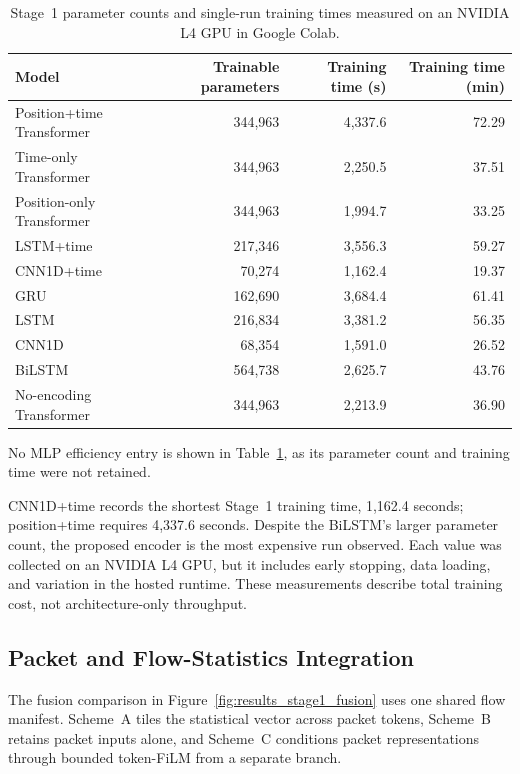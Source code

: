 \documentclass[11pt,fleqn]{report}
\begin{document}
\begin{table}[H]
    \centering
    \caption{Stage~1 parameter counts and single-run training times measured on an NVIDIA L4 GPU in Google Colab.}
    \label{tab:results_stage1_errors_efficiency}
    \begin{tabular}{@{}lrrr@{}}
        \toprule
        Model & Trainable parameters & Training time (s) & Training time (min) \\
        \midrule
        Position+time Transformer & 344,963 & 4,337.6 & 72.29 \\
        Time-only Transformer & 344,963 & 2,250.5 & 37.51 \\
        Position-only Transformer & 344,963 & 1,994.7 & 33.25 \\
        LSTM+time & 217,346 & 3,556.3 & 59.27 \\
        CNN1D+time & 70,274 & 1,162.4 & 19.37 \\
        GRU & 162,690 & 3,684.4 & 61.41 \\
        LSTM & 216,834 & 3,381.2 & 56.35 \\
        CNN1D & 68,354 & 1,591.0 & 26.52 \\
        BiLSTM & 564,738 & 2,625.7 & 43.76 \\
        No-encoding Transformer & 344,963 & 2,213.9 & 36.90 \\
        \bottomrule
    \end{tabular}
\end{table}

No MLP efficiency entry is shown in Table~\ref{tab:results_stage1_errors_efficiency}, as its parameter count and training time were not retained.

CNN1D+time records the shortest Stage~1 training time, 1,162.4 seconds; position+time requires 4,337.6 seconds. Despite the BiLSTM's larger parameter count, the proposed encoder is the most expensive run observed. Each value was collected on an NVIDIA L4 GPU, but it includes early stopping, data loading, and variation in the hosted runtime. These measurements describe total training cost, not architecture-only throughput.

\subsection{Packet and Flow-Statistics Integration}
\label{subsubsec:results_stage1_fusion}

The fusion comparison in Figure~\ref{fig:results_stage1_fusion} uses one shared flow manifest. Scheme~A tiles the statistical vector across packet tokens, Scheme~B retains packet inputs alone, and Scheme~C conditions packet representations through bounded token-FiLM from a separate branch.
\end{document}

